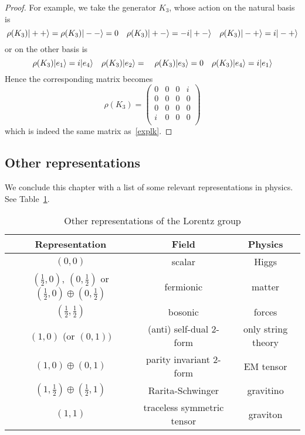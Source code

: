 \begin{proof}
        For example, we take the generator $K_3$, whose action on the natural basis is
        \begin{equation*}
            \rho(K_3) \vert++\rangle = \rho(K_3) \vert--\rangle = 0 \quad \rho(K_3) \vert+-\rangle = - i \vert+-\rangle \quad \rho(K_3) \vert-+\rangle = i \vert-+\rangle
        \end{equation*}
        or on the other basis is
        \begin{equation*}
            \rho(K_3) \vert e_1\rangle = i \vert e_4\rangle \quad \rho(K_3) \vert e_2\rangle = \quad \rho(K_3) \vert e_3\rangle = 0 \quad \rho(K_3) \vert e_4\rangle = i \vert e_1\rangle
        \end{equation*}
        Hence the corresponding matrix becomes 
        \begin{equation*}
            \rho(K_3) = \begin{pmatrix}
                0 & 0 & 0 & i \\
                0 & 0 & 0 & 0 \\
                0 & 0 & 0 & 0 \\
                i & 0 & 0 & 0 \\
            \end{pmatrix}
        \end{equation*}
        which is indeed the same matrix as~\eqref{explk}.
    \end{proof}

\subsection{Other representations}

    We conclude this chapter with a list of some relevant representations in physics. See Table~\ref{table:1}.

    \begin{table}[h!]
        \centering
        \begin{tabular}{c | c | c}
            Representation & Field & Physics \\
            \hline
            $(0,0)$ & scalar & Higgs \\ 
            $(\frac{1}{2}, 0)$, $(0, \frac{1}{2})$ or $(\frac{1}{2}, 0) \oplus (0, \frac{1}{2})$ & fermionic  & matter \\ 
             $(\frac{1}{2}, \frac{1}{2})$ & bosonic  & forces \\ 
            $(1,0)$ (or $(0,1)) $ & (anti) self-dual $2$-form  & only string theory\\
            $(1, 0) \oplus (0, 1)$ & parity invariant 2-form & EM tensor \\
            $(1,\frac{1}{2}) \oplus (\frac{1}{2}, 1)$ & Rarita-Schwinger & gravitino \\
            $(1, 1)$ & traceless symmetric tensor & graviton \\
        \end{tabular}
        \caption{Other representations of the Lorentz group}\label{table:1}
    \end{table}

